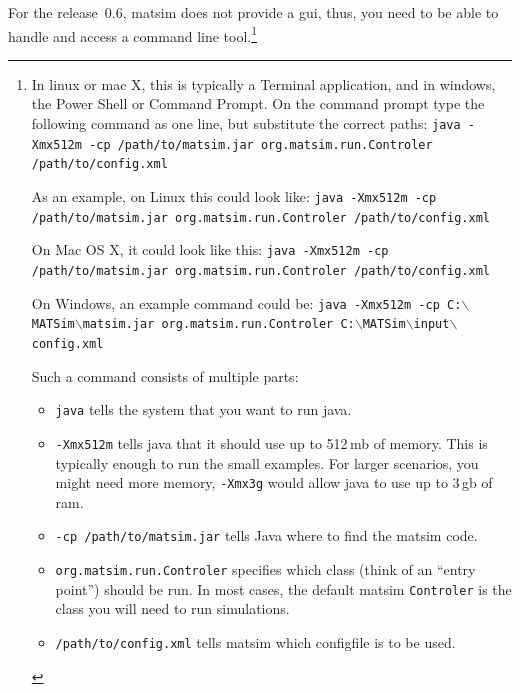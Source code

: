 For the release~0.6, \gls{matsim} does not provide a \gls{gui}, thus, you need to be able to handle and access a command line tool.\footnote{%
%
\baselineskip
\parindent0pt
%
In \gls{linux} or \gls{mac} X, this is typically a Terminal application, and in \gls{windows}, the Power Shell or Command Prompt.
%
On the command prompt type the following command as one line, but substitute the correct paths: 
\lstinline|java -Xmx512m -cp /path/to/matsim.jar org.matsim.run.Controler /path/to/config.xml|

As an example, on Linux this could look like: 
\lstinline|java -Xmx512m -cp /path/to/matsim.jar org.matsim.run.Controler /path/to/config.xml|

On Mac OS X, it could look like this: 
\lstinline|java -Xmx512m -cp /path/to/matsim.jar org.matsim.run.Controler /path/to/config.xml|

On Windows, an example command could be: 
\lstinline{java -Xmx512m -cp C:}$\backslash$\lstinline{MATSim}$\backslash$\lstinline{matsim.jar org.matsim.run.Controler C:}$\backslash$\lstinline{MATSim}$\backslash$\lstinline{input}$\backslash$\lstinline{config.xml}

Such a command consists of multiple parts:
\begin{itemize}\styleItemize
\item \lstinline|java| tells the system that you want to run \gls{java}.
\item \lstinline|-Xmx512m| tells \gls{java} that it should use up to 512\,\gls{mb} of memory. This is typically enough to run the small examples. For larger \glspl{scenario}, you might need more memory, \eg \lstinline|-Xmx3g| would allow \gls{java} to use up to 3\,\gls{gb} of \gls{ram}.
\item \lstinline|-cp /path/to/matsim.jar| tells Java where to find the \gls{matsim} code.
\item \lstinline|org.matsim.run.Controler| specifies which class (think of an ``entry point'') should be run. In most cases, the default \gls{matsim} \lstinline|Controler| is the class you will need to run simulations.
\item \lstinline|/path/to/config.xml| tells \gls{matsim} which \gls{configfile} is to be used. 
\end{itemize}
}

